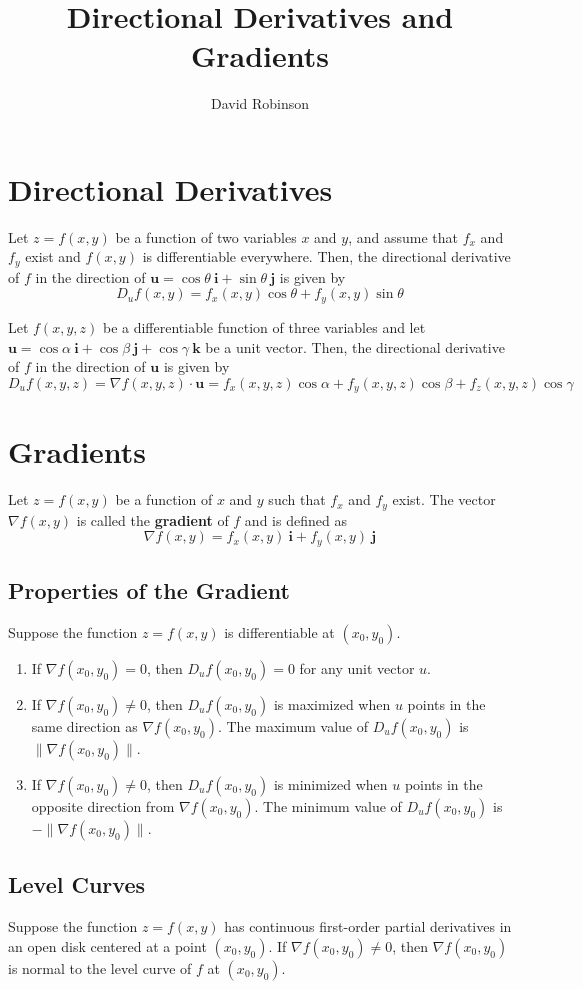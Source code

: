 \documentclass{article}
\title{Directional Derivatives and Gradients}
\author{David Robinson}
\date{}
\begin{document}
\maketitle

\section*{Directional Derivatives}

Let $z=f(x,y)$ be a function of two variables $x$ and $y$, and assume that $f_x$ and $f_y$ exist and $f(x,y)$ is differentiable everywhere. Then, the directional derivative of $f$ in the direction of $\mathbf{u}=\cos\theta\:\mathbf{i}+\sin\theta\:\mathbf{j}$ is given by
\[D_u f(x,y)=f_x(x,y)\cos\theta + f_y(x,y)\sin\theta\]

Let $f(x,y,z)$ be a differentiable function of three variables and let $\mathbf{u}=\cos\alpha\:\mathbf{i}+\cos\beta\:\mathbf{j}+\cos\gamma\:\mathbf{k}$ be a unit vector. Then, the directional derivative of $f$ in the direction of $\mathbf{u}$ is given by
\[D_u f(x,y,z)=\nabla f(x,y,z)\cdot\mathbf{u}=f_x(x,y,z)\cos\alpha+f_y(x,y,z)\cos\beta+f_z(x,y,z)\cos\gamma\]

\section*{Gradients}

Let $z=f(x,y)$ be a function of $x$ and $y$ such that $f_x$ and $f_y$ exist. The vector $\nabla f(x,y)$ is called the \textbf{gradient} of $f$ and is defined as
\[\nabla f(x,y)=f_x(x,y)\:\mathbf{i}+f_y(x,y)\:\mathbf{j}\]

\subsection*{Properties of the Gradient}
Suppose the function $z=f(x,y)$ is differentiable at $(x_0, y_0)$.
\begin{enumerate}
    \item If $\nabla f(x_0, y_0)=0$, then $D_u f(x_0, y_0) = 0$ for any unit vector $u$.
    \item If $\nabla f(x_0, y_0)\neq 0$, then $D_u f(x_0, y_0)$ is maximized when $u$ points in the same direction as $\nabla f(x_0, y_0)$. The maximum value of $D_u f(x_0, y_0)$ is $\|\nabla f(x_0, y_0)\|$.
    \item If $\nabla f(x_0, y_0)\neq 0$, then $D_u f(x_0, y_0)$ is minimized when $u$ points in the opposite direction from $\nabla f(x_0, y_0)$. The minimum value of $D_u f(x_0, y_0)$ is $-\|\nabla f(x_0, y_0)\|$.
\end{enumerate}

\subsection*{Level Curves}

Suppose the function $z=f(x,y)$ has continuous first-order partial derivatives in an open disk centered at a point $(x_0,y_0)$. If $\nabla f(x_0,y_0)\neq 0$, then $\nabla f(x_0, y_0)$ is normal to the level curve of $f$ at $(x_0,y_0)$.
\end{document}
